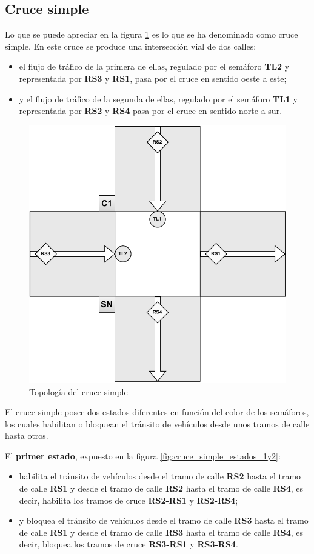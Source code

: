 \subsection{Cruce simple}
    \label{subsection:cruce_simple}
Lo que se puede apreciar en la figura \ref{fig:cruce_simple_topologia} es lo que se ha denominado como cruce simple. En este cruce se produce una intersección vial de dos calles: 
\begin{itemize}
    \item el flujo de tráfico de la primera de ellas, regulado por el semáforo \textbf{TL2} y representada por \textbf{RS3} y \textbf{RS1}, pasa por el cruce en sentido oeste a este; 
    \item y el flujo de tráfico de la segunda de ellas, regulado por el semáforo \textbf{TL1} y representada por \textbf{RS2} y \textbf{RS4} pasa por el cruce en sentido norte a sur.
\end{itemize}
\begin{figure}[H]
    \centering
    \includegraphics[width=0.75\linewidth]{text/image/DCruc-CS-Topologia.pdf}
    \caption{Topología del cruce simple}
    \label{fig:cruce_simple_topologia}
\end{figure}

\newpage
El cruce simple posee dos estados diferentes en función del color de los semáforos, los cuales habilitan o bloquean el tránsito de vehículos desde unos tramos de calle hasta otros.

El \textbf{primer estado}, expuesto en la figura \ref{fig:cruce_simple_estados_1y2}:
\begin{itemize}
    \item habilita el tránsito de vehículos desde el tramo de calle \textbf{RS2} hasta el tramo de calle \textbf{RS1} y desde el tramo de calle \textbf{RS2} hasta el tramo de calle \textbf{RS4}, es decir, habilita los tramos de cruce \textbf{RS2-RS1} y \textbf{RS2-RS4};
    \item y bloquea el tránsito de vehículos desde el tramo de calle \textbf{RS3} hasta el tramo de calle \textbf{RS1} y desde el tramo de calle \textbf{RS3} hasta el tramo de calle \textbf{RS4}, es decir, bloquea los tramos de cruce \textbf{RS3-RS1} y \textbf{RS3-RS4}.
\end{itemize}

